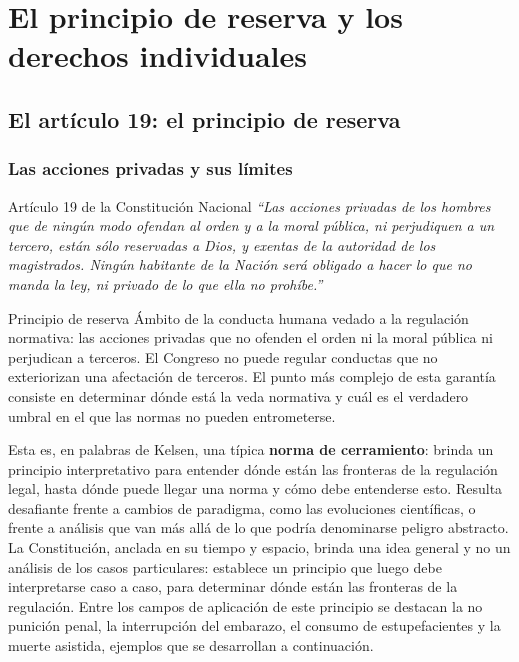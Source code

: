 \documentclass[12pt,oneside]{book}
\begin{document}
\part{El principio de reserva y los derechos individuales}

\chapter{El artículo 19: el principio de reserva}

\section{Las acciones privadas y sus límites}

\begin{norma}{Artículo 19 de la Constitución Nacional}
\textit{``Las acciones privadas de los hombres que de ningún modo ofendan al orden y a la moral pública, ni perjudiquen a un tercero, están sólo reservadas a Dios, y exentas de la autoridad de los magistrados. Ningún habitante de la Nación será obligado a hacer lo que no manda la ley, ni privado de lo que ella no prohíbe.''}
\end{norma}

\begin{definition}{Principio de reserva}
Ámbito de la conducta humana vedado a la regulación normativa: las acciones privadas que no ofenden el orden ni la moral pública ni perjudican a terceros. El Congreso no puede regular conductas que no exteriorizan una afectación de terceros. El punto más complejo de esta garantía consiste en determinar dónde está la veda normativa y cuál es el verdadero umbral en el que las normas no pueden entrometerse.
\end{definition}

Esta es, en palabras de Kelsen, una típica \textbf{norma de cerramiento}: brinda un principio interpretativo para entender dónde están las fronteras de la regulación legal, hasta dónde puede llegar una norma y cómo debe entenderse esto. Resulta desafiante frente a cambios de paradigma, como las evoluciones científicas, o frente a análisis que van más allá de lo que podría denominarse peligro abstracto. La Constitución, anclada en su tiempo y espacio, brinda una idea general y no un análisis de los casos particulares: establece un principio que luego debe interpretarse caso a caso, para determinar dónde están las fronteras de la regulación. Entre los campos de aplicación de este principio se destacan la no punición penal, la interrupción del embarazo, el consumo de estupefacientes y la muerte asistida, ejemplos que se desarrollan a continuación.
\end{document}
